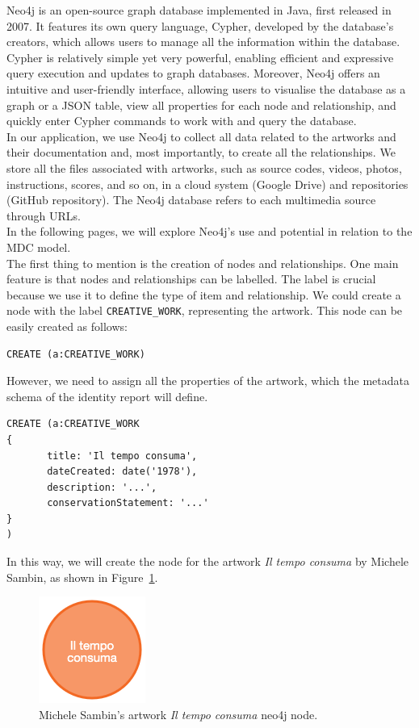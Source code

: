 Neo4j is an open-source graph database implemented in Java, first released in 2007. It features its own query language, Cypher, developed by the database's creators, which allows users to manage all the information within the database. Cypher is relatively simple yet very powerful, enabling efficient and expressive query execution and updates to graph databases. Moreover, Neo4j offers an intuitive and user-friendly interface, allowing users to visualise the database as a graph or a JSON table, view all properties for each node and relationship, and quickly enter Cypher commands to work with and query the database.\\
In our application, we use Neo4j to collect all data related to the artworks and their documentation and, most importantly, to create all the relationships. We store all the files associated with artworks, such as source codes, videos, photos, instructions, scores, and so on, in a cloud system (Google Drive) and repositories (GitHub repository). The Neo4j database refers to each multimedia source through URLs.\\
In the following pages, we will explore Neo4j's use and potential in relation to the MDC model.\\
\newline
The first thing to mention is the creation of nodes and relationships. One main feature is that nodes and relationships can be labelled. The label is crucial because we use it to define the type of item and relationship. We could create a node with the label \texttt{CREATIVE\_WORK}, representing the artwork. This node can be easily created as follows:
\begin{lstlisting}[style=cypher]
CREATE (a:CREATIVE_WORK)
\end{lstlisting}
However, we need to assign all the properties of the artwork, which the metadata schema of the identity report will define.
\begin{lstlisting}[style=cypher]
CREATE (a:CREATIVE_WORK
{
       title: 'Il tempo consuma',
       dateCreated: date('1978'),
       description: '...',
       conservationStatement: '...'
}
)
\end{lstlisting}
In this way, we will create the node for the artwork \textit{Il tempo consuma} by Michele Sambin, as shown in Figure~\ref{fig:c4-neo4j-creativework}.
\begin{figure}[!h]
    \centering
    \includegraphics[width=0.165\linewidth]{chapters/4-MDC_model_application/image/neo4j-singlenode.png}
    \caption{Michele Sambin's artwork \textit{Il tempo consuma} neo4j node.}
    \label{fig:c4-neo4j-creativework}
\end{figure}
